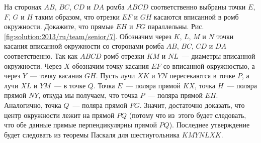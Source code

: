 \problem{}
На сторонах $AB$, $BC$, $CD$ и $DA$ ромба $ABCD$ соответственно выбраны точки
$E$, $F$, $G$ и $H$ таким образом, что отрезки $EF$ и $GH$ касаются вписанной в
ромб окружности.
Докажите, что прямые $EH$ и $FG$ параллельны.
%
\label{solution:2013/ru/team/senior/7}
Рис. \ref{fig:solution:2013/ru/team/senior/7}.
Обозначим через $K$, $L$, $M$ и $N$ точки касания вписанной окружности со
сторонами ромба $AB$, $BC$, $CD$ и $DA$ соответственно.
Так как $ABCD$ ромб отрезки $KM$ и $NL$~--- диаметры вписанной окружности.
Через $X$ обозначим точку касания $EF$ со вписанной окружностью, а через
$Y$~--- точку касания $GH$.
Пусть лучи $XK$ и $YN$ пересекаются в точке $P$, а лучи $XL$ и $YM$~--- в точке
$Q$.
Точка $E$~--- поляра прямой $KX$, точка $H$~--- поляра прямой $NY$, откуда мы
получаем, что точка $P$~--- поляра прямой $EH$.
Аналогично, точка $Q$~--- поляра прямой $FG$.
Значит, достаточно доказать, что центр окружности лежит на прямой $PQ$
(потому что из~этого будет следовать, что обе данные прямые перпендикулярны
прямой $PQ$).
Последнее утверждение будет следовать из теоремы Паскаля для шестиугольника
$KMYNLXK$.
\endproblem
